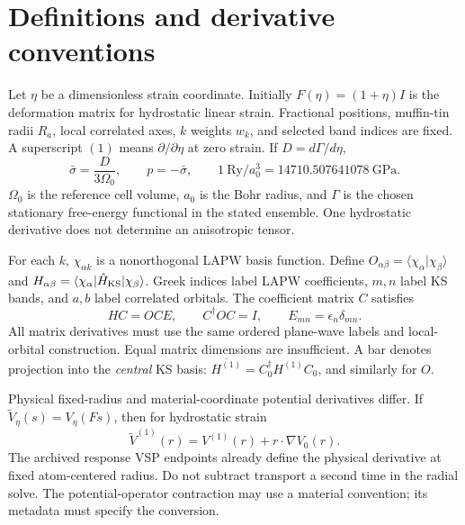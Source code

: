 \documentclass[11pt]{article}
\begin{document}
\section{Definitions and derivative conventions}
Let $\eta$ be a dimensionless strain coordinate. Initially $F(\eta)=(1+\eta)I$ is the deformation matrix for hydrostatic linear strain. Fractional positions, muffin-tin radii $R_a$, local correlated axes, $k$ weights $w_k$, and selected band indices are fixed. A superscript $(1)$ means $\partial/\partial\eta$ at zero strain. If $D=d\Gamma/d\eta$,
\begin{equation}
\bar\sigma=\frac{D}{3\Omega_0},\qquad p=-\bar\sigma,\qquad
1\ \mathrm{Ry}/a_0^3=14710.507641078\ \mathrm{GPa}.
\end{equation}
$\Omega_0$ is the reference cell volume, $a_0$ is the Bohr radius, and $\Gamma$ is the chosen stationary free-energy functional in the stated ensemble. One hydrostatic derivative does not determine an anisotropic tensor.

For each $k$, $\chi_{\alpha k}$ is a nonorthogonal LAPW basis function. Define $O_{\alpha\beta}=\langle\chi_\alpha|\chi_\beta\rangle$ and $H_{\alpha\beta}=\langle\chi_\alpha|\hat H_{\rm KS}|\chi_\beta\rangle$. Greek indices label LAPW coefficients, $m,n$ label KS bands, and $a,b$ label correlated orbitals. The coefficient matrix $C$ satisfies
\begin{equation}
HC=OC E,\qquad C^\dagger OC=I,\qquad E_{mn}=\epsilon_n\delta_{mn}.
\end{equation}
All matrix derivatives must use the same ordered plane-wave labels and local-orbital construction. Equal matrix dimensions are insufficient. A bar denotes projection into the \emph{central} KS basis: $\overline{H^{(1)}}=C_0^\dagger H^{(1)}C_0$, and similarly for $O$.

Physical fixed-radius and material-coordinate potential derivatives differ. If $\widetilde V_\eta(s)=V_\eta(Fs)$, then for hydrostatic strain
\begin{equation}
\widetilde V^{(1)}(r)=V^{(1)}(r)+r\cdot\nabla V_0(r).
\end{equation}
The archived response VSP endpoints already define the physical derivative at fixed atom-centered radius. Do not subtract transport a second time in the radial solve. The potential-operator contraction may use a material convention; its metadata must specify the conversion.
\end{document}
